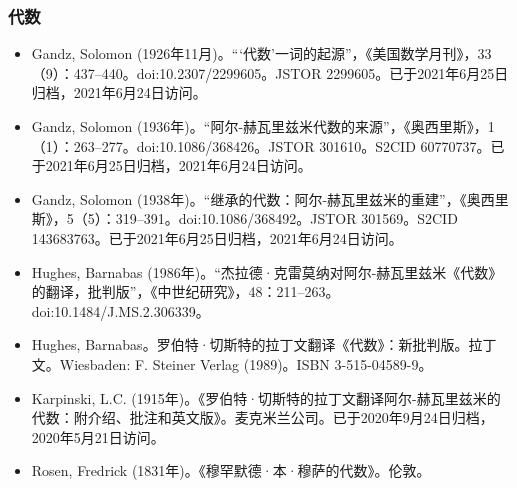 \subsubsection{代数}  
\begin{itemize}
\item Gandz, Solomon (1926年11月)。“‘代数’一词的起源”，《美国数学月刊》，33（9）：437–440。doi:10.2307/2299605。JSTOR 2299605。已于2021年6月25日归档，2021年6月24日访问。  
\item Gandz, Solomon (1936年)。“阿尔-赫瓦里兹米代数的来源”，《奥西里斯》，1（1）：263–277。doi:10.1086/368426。JSTOR 301610。S2CID 60770737。已于2021年6月25日归档，2021年6月24日访问。  
\item Gandz, Solomon (1938年)。“继承的代数：阿尔-赫瓦里兹米的重建”，《奥西里斯》，5（5）：319–391。doi:10.1086/368492。JSTOR 301569。S2CID 143683763。已于2021年6月25日归档，2021年6月24日访问。  
\item Hughes, Barnabas (1986年)。“杰拉德·克雷莫纳对阿尔-赫瓦里兹米《代数》的翻译，批判版”，《中世纪研究》，48：211–263。doi:10.1484/J.MS.2.306339。  
\item Hughes, Barnabas。罗伯特·切斯特的拉丁文翻译《代数》：新批判版。拉丁文。Wiesbaden: F. Steiner Verlag (1989)。ISBN 3-515-04589-9。
\item Karpinski, L.C. (1915年)。《罗伯特·切斯特的拉丁文翻译阿尔-赫瓦里兹米的代数：附介绍、批注和英文版》。麦克米兰公司。已于2020年9月24日归档，2020年5月21日访问。  
\item Rosen, Fredrick (1831年)。《穆罕默德·本·穆萨的代数》。伦敦。
\end{itemize}